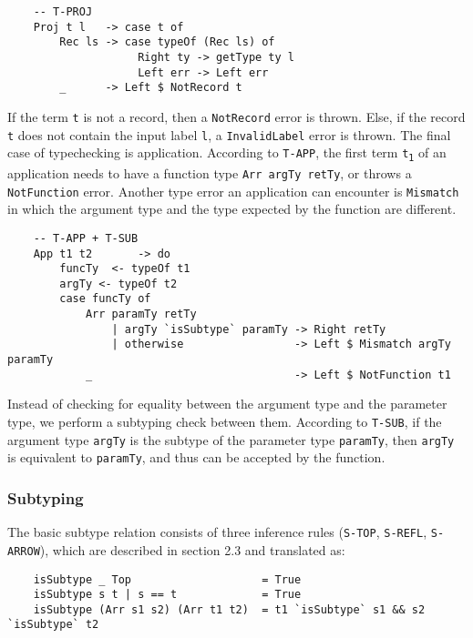 \documentclass[fleqn, 11pt]{article}
\begin{document}
\begin{Verbatim}
    -- T-PROJ
    Proj t l   -> case t of                                
        Rec ls -> case typeOf (Rec ls) of                       
                    Right ty -> getType ty l
                    Left err -> Left err
        _      -> Left $ NotRecord t 
\end{Verbatim}

If the term \texttt{t} is not a record, then a \texttt{NotRecord} error is thrown. Else, if the record \texttt{t} does not contain the input 
label \texttt{l}, a \texttt{InvalidLabel} error is thrown. The final case of typechecking is application. According to \texttt{T-APP}, the first 
term \texttt{t\textsubscript{1}} of an application needs to have a function type \texttt{Arr argTy retTy}, or throws a \texttt{NotFunction} 
error. Another type error an application can encounter is \texttt{Mismatch} in which the argument type and the type expected by the function 
are different. 

\begin{Verbatim}
    -- T-APP + T-SUB
    App t1 t2       -> do                                            
        funcTy  <- typeOf t1   
        argTy <- typeOf t2                         
        case funcTy of 
            Arr paramTy retTy 
                | argTy `isSubtype` paramTy -> Right retTy
                | otherwise                 -> Left $ Mismatch argTy paramTy
            _                               -> Left $ NotFunction t1
\end{Verbatim}

Instead of checking for equality between the argument type and the parameter type, we perform a subtyping check between them. According to  
\texttt{T-SUB}, if the argument type \texttt{argTy} is the subtype of the parameter type \texttt{paramTy}, then \texttt{argTy} is equivalent to 
\texttt{paramTy}, and thus can be accepted by the function.  

\subsubsection{Subtyping}

The basic subtype relation consists of three inference rules (\texttt{S-TOP}, \texttt{S-REFL}, \texttt{S-ARROW}), which are 
described in section 2.3 and translated as:

\begin{Verbatim}
    isSubtype _ Top                    = True                                      
    isSubtype s t | s == t             = True                                     
    isSubtype (Arr s1 s2) (Arr t1 t2)  = t1 `isSubtype` s1 && s2 `isSubtype` t2 
\end{Verbatim}
\end{document}
